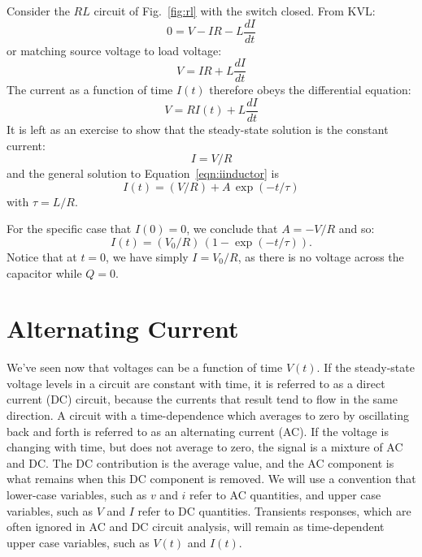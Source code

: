 \documentclass[12pt,oneside]{book}
\begin{document}
Consider the $RL$ circuit of Fig.~\ref{fig:rl} with the switch closed.  From KVL:
\begin{displaymath}
0 = V - IR - L\frac{dI}{dt}
\end{displaymath}
or matching source voltage to load voltage:
\begin{displaymath}
V = IR + L\frac{dI}{dt}
\end{displaymath}
The current as a function of time $I(t)$ therefore obeys the differential equation:
\begin{equation} \label{eqn:iinductor}
V = R I(t) + L \frac{dI}{dt}
\end{equation}
It is left as an exercise to show that the steady-state solution is the constant current:
\begin{displaymath}
I = V / R
\end{displaymath}
and the general solution to Equation~\ref{eqn:iinductor} is 
\begin{displaymath}
I(t) = (V / R) + A \, \exp(-t/\tau) 
\end{displaymath}
with $\tau = L / R$.

For the specific case that $I(0) = 0$, we conclude that $A = -V/R$ and so:
\begin{displaymath}
I(t) = (V_0/R) \, (1 - \exp(-t / \tau)).
\end{displaymath}
Notice that at $t=0$, we have simply $I = V_0/R$, as there is no voltage across the capacitor while $Q=0$.

\section{Alternating Current}
 
 We've seen now that voltages can be a function of time $V(t)$.    If the steady-state voltage levels in a circuit are constant with time, it is referred to as a direct current (DC) circuit, because the currents that result tend to flow in the same direction.   A circuit with a time-dependence which averages to zero by oscillating back and forth is referred to as an alternating current (AC).   If the voltage is changing with time, but does not average to zero, the signal is a mixture of AC and DC.  The DC contribution is the average value, and the AC component is what remains when this DC component is removed.  We will use a convention that lower-case variables, such as $v$ and $i$ refer to AC quantities, and upper case variables, such as $V$ and $I$ refer to DC quantities.  Transients responses, which are often ignored in AC and DC circuit analysis, will remain as time-dependent upper case variables, such as $V(t)$ and $I(t)$.
   
\end{document}
